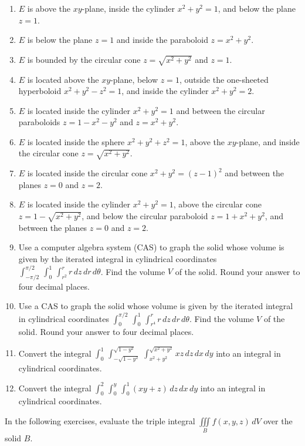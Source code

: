 \documentclass{exercises}
\begin{document}
\begin{enumerate}[resume]
\item $E$ is above the $xy$-plane, inside the cylinder $x^{2}+y^{2}=1$, and below the plane $z=1$.
\item $E$ is below the plane $z=1$ and inside the paraboloid $z=x^{2}+y^{2}$.
\item $E$ is bounded by the circular cone $z=\sqrt{x^{2}+y^{2}}$ and $z=1$.
\item $E$ is located above the $xy$-plane, below $z=1$, outside the one-sheeted hyperboloid $x^{2}+y^{2}-z^{2}=1$, and inside the cylinder $x^{2}+y^{2}=2$.
\item $E$ is located inside the cylinder $x^{2}+y^{2}=1$ and between the circular paraboloids $z=1-x^{2}-y^{2}$ and $z=x^{2}+y^{2}$.
\item $E$ is located inside the sphere $x^{2}+y^{2}+z^{2}=1$, above the $xy$-plane, and inside the circular cone $z=\sqrt{x^{2}+y^{2}}$.
\item $E$ is located inside the circular cone $x^{2}+y^{2}={(z-1)}^{2}$ and between the planes $z=0$ and $z=2$.
\item $E$ is located inside the cylinder $x^{2}+y^{2}=1$, above the circular cone $z=1-\sqrt{x^{2}+y^{2}}$, and below the circular paraboloid $z=1+x^{2}+y^{2}$, and between the planes $z=0$ and $z=2$.
\item \techrequired Use a computer algebra system (CAS) to graph the solid whose volume is given by the iterated integral in cylindrical coordinates $\int_{-\pi/2}^{\pi/2}\,\int_{0}^{1}\,\int_{r^{2}}^{r}r\,dz\,dr\,d\theta$. Find the volume $V$ of the solid. Round your answer to four decimal places.
\item \techrequired Use a CAS to graph the solid whose volume is given by the iterated integral in cylindrical coordinates $\int_{0}^{\pi/2}\,\int_{0}^{1}\,\int_{r^{4}}^{r}r\,dz\,dr\,d\theta$. Find the volume $V$ of the solid. Round your answer to four decimal places.
\item Convert the integral $\int_{0}^{1}\,\int_{-\sqrt{1-y^{2}}}^{\sqrt{1-y^{2}}}\,\int_{x^{2}+y^{2}}^{\sqrt{x^{2}+y^{2}}}xz\,dz\,dx\,dy$ into an integral in cylindrical coordinates.
\item Convert the integral $\int_{0}^{2}\,\int_{0}^{y}\,\int_{0}^{1}(xy+z)\,dz\,dx\,dy$ into an integral in cylindrical coordinates.
\end{enumerate}

In the following exercises, evaluate the triple integral $\underset{B}{\iiint}f(x,y,z)\,dV$ over the solid $B$.
\end{document}
